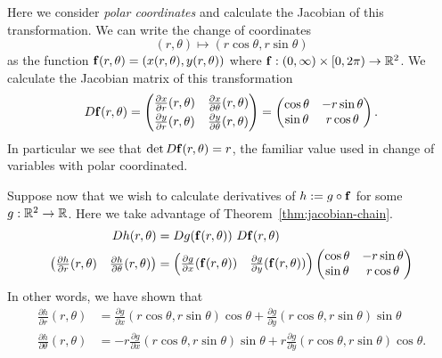 \begin{example*}
    Here we consider \emph{polar coordinates} and calculate the Jacobian of this transformation.
    We can write the change of coordinates
    \[
        (r,\theta) \mapsto (r\cos \theta, r\sin \theta)
    \]
    as the function  \(\mathbf{f}(r,\theta) = (x(r,\theta),y(r,\theta))\) where \(\mathbf{f}:(0,\infty)\times [0,2\pi) \to \mathbb{R}^2\). %
    We calculate the Jacobian matrix of this transformation
    \[
        D\mathbf{f}(r,\theta) =
        \begin{pmatrix}
            \tfrac{\partial x}{\partial r}(r,\theta) & \tfrac{\partial x}{\partial \theta}(r,\theta) \\[2pt]
            \tfrac{\partial y}{\partial r}(r,\theta) & \tfrac{\partial y}{\partial \theta}(r,\theta)
        \end{pmatrix}
        =
        \begin{pmatrix}
            \cos \theta & -r\sin \theta \\
            \sin \theta & r\cos \theta
        \end{pmatrix}.
    \]
    In particular we see that \(\det D\mathbf{f}(r,\theta) = r\), the familiar value used in change of variables with polar coordinated.

    Suppose now that we wish to calculate derivatives of \(h := g \circ \mathbf{f}\) for some  \(g:\mathbb{R}^2 \to \mathbb{R}\).
    Here we take advantage of Theorem~\ref{thm:jacobian-chain}.
    \[
        \begin{aligned}
            Dh(r,\theta) & = Dg(\mathbf{f}(r,\theta)) \ D\mathbf{f}(r,\theta) \\
            \begin{pmatrix}
                \frac{\partial h}{\partial r}(r,\theta) & \frac{\partial h}{\partial \theta}(r,\theta)
            \end{pmatrix}
                         & =
            \begin{pmatrix}
                \frac{\partial g}{\partial x}(\mathbf{f}(r,\theta)) & \frac{\partial g}{\partial y}(\mathbf{f}(r,\theta))
            \end{pmatrix}
            \begin{pmatrix}
                \cos \theta & -r\sin \theta \\
                \sin \theta & r\cos \theta
            \end{pmatrix}
        \end{aligned}
    \]
    In other words, we have shown that
    \[
        \begin{aligned}
            \frac{\partial h}{\partial r}(r,\theta)
             & = \frac{\partial g}{\partial x}(r\cos \theta, r\sin \theta) \cos \theta + \frac{\partial g}{\partial y}(r\cos \theta, r\sin \theta)\sin \theta         \\
            \frac{\partial h}{\partial \theta}(r,\theta)
             & = - r \frac{\partial g}{\partial x}(r\cos \theta, r\sin \theta) \sin \theta +  r \frac{\partial g}{\partial y}(r\cos \theta, r\sin \theta)\cos \theta.
        \end{aligned}
    \]
\end{example*}


